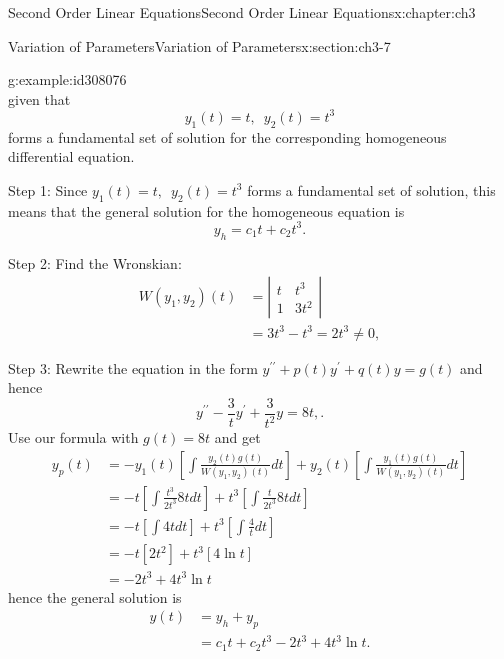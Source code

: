 \documentclass[oneside,10pt,]{book}
\numberwithin{equation}{section}
\numberwithin{equation}{section}
\newcommand{\amp}{&}
\begin{document}
\begin{chapterptx}{Second Order Linear Equations}{}{Second Order Linear Equations}{}{}{x:chapter:ch3}
\begin{sectionptx}{Variation of Parameters}{}{Variation of Parameters}{}{}{x:section:ch3-7}
\begin{example}{}{g:example:id308076}
\begin{equation*}
\end{equation*}
given that%
\begin{equation*}
y_{1}(t)=t,\,\,\,y_{2}(t)=t^{3}
\end{equation*}
forms a fundamental set of solution for the corresponding homogeneous differential equation.%
\par
Step 1: Since \(y_{1}(t)=t,\,\,\,y_{2}(t)=t^{3}\) forms a fundamental set of solution, this means that the general solution for the homogeneous equation is%
\begin{equation*}
y_{h}=c_{1}t+c_{2}t^{3}.
\end{equation*}
%
\par
Step 2: Find the Wronskian:%
\begin{align*}
W(y_{1},y_{2})(t) \amp =\left|\begin{array}{cc}
t \amp t^{3}\\
1 \amp 3t^{2}
\end{array}\right|\\
\amp =3t^{3}-t^{3}=2t^{3}\neq0,
\end{align*}
%
\par
Step 3: Rewrite the equation in the form \(y^{\prime\prime}+p(t)y^{\prime}+q(t)y=g(t)\) and hence%
\begin{equation*}
y^{\prime\prime}-\frac{3}{t}y^{\prime}+\frac{3}{t^{2}}y=8t,.
\end{equation*}
Use our formula with \(g(t)=8t\) and get%
\begin{align*}
y_{p}(t) \amp =-y_{1}(t)\left[\int\frac{y_{2}(t)g(t)}{W\left(y_{1},y_{2}\right)(t)}dt\right]+y_{2}(t)\left[\int\frac{y_{1}(t)g(t)}{W\left(y_{1},y_{2}\right)(t)}dt\right]\\
\amp =-t\left[\int\frac{t^{3}}{2t^{3}}8tdt\right]+t^{3}\left[\int\frac{t}{2t^{3}}8tdt\right]\\
\amp =-t\left[\int4tdt\right]+t^{3}\left[\int\frac{4}{t}dt\right]\\
\amp =-t\left[2t^{2}\right]+t^{3}\left[4\ln t\right]\\
\amp =-2t^{3}+4t^{3}\ln t
\end{align*}
hence the general solution is%
\begin{align*}
y(t) \amp =y_{h}+y_{p}\\
\amp =c_{1}t+c_{2}t^{3}-2t^{3}+4t^{3}\ln t.
\end{align*}
%
\end{example}
\end{sectionptx}
\end{chapterptx}
%
%
\typeout{************************************************}
\end{document}
